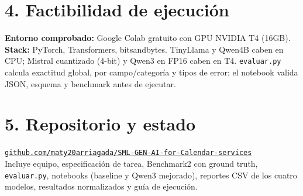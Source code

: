 \documentclass[10pt,a4paper]{article}
\begin{document}
\section*{4. Factibilidad de ejecuci\'on}
\textbf{Entorno comprobado:} Google Colab gratuito con GPU NVIDIA T4 (16GB). \textbf{Stack:} PyTorch, Transformers, bitsandbytes. TinyLlama y Qwen4B caben en CPU; Mistral cuantizado (4-bit) y Qwen3 en FP16 caben en T4. \texttt{evaluar.py} calcula exactitud global, por campo/categor\'ia y tipos de error; el notebook valida JSON, esquema y benchmark antes de ejecutar.

\section*{5. Repositorio y estado}
\href{https://github.com/maty20arriagada/SML-GEN-AI-for-Calendar-services}{\texttt{github.com/maty20arriagada/SML-GEN-AI-for-Calendar-services}}\\[-0.1em]
Incluye equipo, especificaci\'on de tarea, Benchmark2 con ground truth, \texttt{evaluar.py}, notebooks (baseline y Qwen3 mejorado), reportes CSV de los cuatro modelos, resultados normalizados y gu\'ia de ejecuci\'on.
\end{document}
